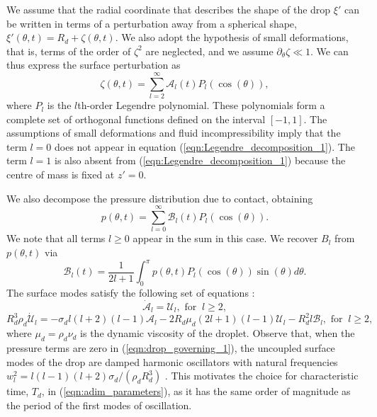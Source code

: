 \documentclass{jfm}
\begin{document}
We assume that the radial coordinate that describes the shape of the drop $\xi'$ can be written in terms of a perturbation away from a spherical shape, $\xi'(\theta,t) = R_d + \zeta(\theta,t)$. We also adopt the hypothesis of small deformations, that is, terms of the order of $\zeta^2$ are neglected, and we assume $\partial_{\theta} \zeta \ll 1$. We can thus express the surface perturbation as 
\begin{equation}
    \label{eqn:Legendre_decomposition_1}
    \zeta(\theta, t) = \sum\limits_{l = 2}^{\infty} \mathcal{A}_l(t) P_l(\cos(\theta)),
\end{equation}
where $P_l$ is the $l$th-order Legendre polynomial. These polynomials form a complete set of orthogonal functions defined on the interval $[-1, 1]$. The assumptions of small deformations and fluid incompressibility imply that the term $l =0$ does not appear in equation (\ref{eqn:Legendre_decomposition_1}). The term $l=1$ is also absent from (\ref{eqn:Legendre_decomposition_1}) because the centre of mass is fixed at $z'=0$. 

We also decompose the pressure distribution due to contact, obtaining
\begin{equation}
    p\left(\theta,t\right) = \sum_{l = 0}^{\infty} \mathcal{B}_l(t) P_l\left(\cos(\theta)\right).
\end{equation}
We note that all terms $l\geq 0$ appear in the sum in this case. We recover $B_l$ from $p(\theta, t)$ via
\begin{equation}
    \mathcal{B}_l(t) = \frac{1}{2l + 1} \int_{0}^{\pi} p(\theta, t) P_l(\cos(\theta)) \sin(\theta) d\theta.
    \label{eqn:Legendre_projection}
\end{equation}
The surface modes satisfy the following set of equations \citep{AlventosaEtAl2023, Lamb,phillips2024lubrication,Blanchette2016}: 
\begin{equation}
    \label{eqn:drop_governing}
    \dot{\mathcal{A}}_l = \mathcal{U}_l , \text{ for } \ l \geq 2,
\end{equation}
\begin{equation}
    \label{eqn:drop_governing_1}
    R_d^3 \rho_d \dot{\mathcal{U}}_l = - \sigma_d l(l+2)(l-1) \mathcal{A}_l- 2 R_d \mu_d (2l+1)(l-1)\mathcal{U}_l-R_d^2l\mathcal{B}_l , \text{ for } \ l \geq 2,
\end{equation}
where $\mu_d = \rho_d \nu_d$ is the dynamic viscosity of the droplet. Observe that, when the pressure terms are zero in (\ref{eqn:drop_governing_1}), the uncoupled surface modes of the drop are damped harmonic oscillators with natural frequencies $w_l^2 = l(l-1)(l+2) \sigma_d / \left( \rho_d R_d^3\right)$ \citep{Lamb}. This motivates the choice for characteristic time, $T_d$, in (\ref{eqn:adim_parameters}), as it has the same order of magnitude as the period of the first modes of oscillation.
\end{document}
